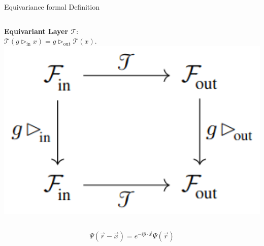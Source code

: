 \documentclass[aspectratio=64,8pt]{beamer}
\begin{document}
\begin{frame}{Equivariance formal Definition}
\begin{itemize}
\begin{columns}
        \begin{column}{0.3\linewidth}
          \begin{center}
            \textbf{Equivariant Layer $\mathcal{T}$}: \\$\mathcal{T}(g\rhd_{\textrm{in}}x)=g\rhd_{\textrm{out}}\mathcal{T}(x)$.     
            \includegraphics[width=1\textwidth]{Immagini/Commutativity_Equivariance.png}
          \end{center}          
        \end{column}
      \end{columns}
      
      \begin{tcolorbox}[title=\textbf{What's the role of equivariance in Physics?},colback=blue!5!white]
          \vspace{-10pt}
        \begin{columns}

            \begin{column}{0.28\linewidth}
              {\small 
              \begin{equation}\nonumber
                \Psi(\vec{r}-\vec{x}) = e^{-i\hat{p}\cdot\vec{x}}\Psi(\vec{r})
              \end{equation}
              }
            \end{column}


\end{columns}
\end{tcolorbox}
\end{itemize}
\end{frame}
\end{document}
